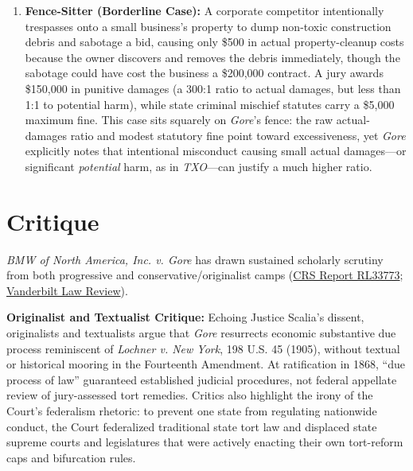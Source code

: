 \documentclass[12pt]{article}
\begin{document}
\begin{enumerate}
\item \textbf{Fence-Sitter (Borderline Case):} A corporate competitor intentionally trespasses onto a small business's property to dump non-toxic construction debris and sabotage a bid, causing only \$500 in actual property-cleanup costs because the owner discovers and removes the debris immediately, though the sabotage could have cost the business a \$200,000 contract. A jury awards \$150,000 in punitive damages (a 300:1 ratio to actual damages, but less than 1:1 to potential harm), while state criminal mischief statutes carry a \$5,000 maximum fine. This case sits squarely on \textit{Gore}'s fence: the raw actual-damages ratio and modest statutory fine point toward excessiveness, yet \textit{Gore} explicitly notes that intentional misconduct causing small actual damages---or significant \textit{potential} harm, as in \textit{TXO}---can justify a much higher ratio.
\end{enumerate}

\section{Critique}

\textit{BMW of North America, Inc. v. Gore} has drawn sustained scholarly scrutiny from both progressive and conservative/originalist camps (\href{https://www.everycrsreport.com/reports/RL33773.html}{CRS Report RL33773}; \href{https://scholarship.law.vanderbilt.edu/cgi/viewcontent.cgi?article=1305&context=vlr}{Vanderbilt Law Review}).

\textbf{Originalist and Textualist Critique:} Echoing Justice Scalia's dissent, originalists and textualists argue that \textit{Gore} resurrects economic substantive due process reminiscent of \textit{Lochner v. New York}, 198 U.S. 45 (1905), without textual or historical mooring in the Fourteenth Amendment. At ratification in 1868, ``due process of law'' guaranteed established judicial procedures, not federal appellate review of jury-assessed tort remedies. Critics also highlight the irony of the Court's federalism rhetoric: to prevent one state from regulating nationwide conduct, the Court federalized traditional state tort law and displaced state supreme courts and legislatures that were actively enacting their own tort-reform caps and bifurcation rules.
\end{document}
